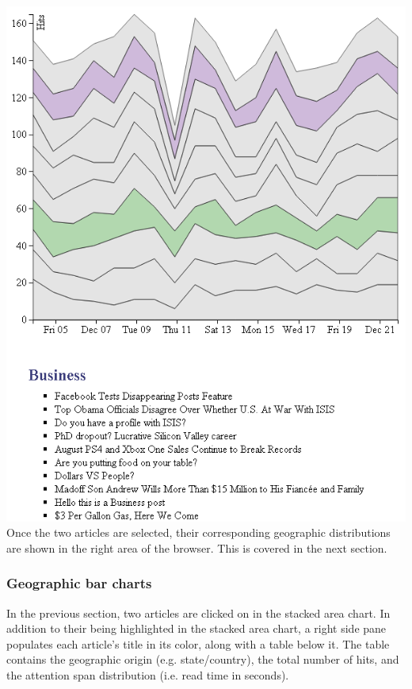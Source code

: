 \documentclass[12pt]{article}
\begin{document}
{\noindent\includegraphics[scale=0.8]{img/viz_7} \\

\noindent Once the two articles are selected, their corresponding geographic distributions are shown in the right area of the browser. This is covered in the next section. 

\newpage

\subsubsection{Geographic bar charts}

In the previous section, two articles are clicked on in the stacked area chart. In addition to their being highlighted in the stacked area chart, a right side pane populates each article's title in its color, along with a table below it. The table contains the geographic origin (e.g. state/country), the total number of hits, and the attention span distribution (i.e. read time in seconds).\\

}
\end{document}
